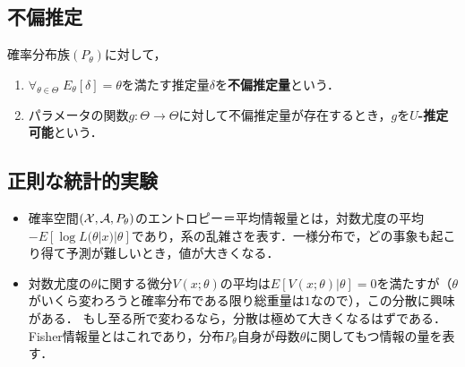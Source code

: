 \documentclass[uplatex,dvipdfmx]{jsreport}
\begin{document}
\subsection{不偏推定}

\begin{definition}
    確率分布族$(P_\theta)$に対して，
    \begin{enumerate}
        \item $\forall_{\theta\in\Theta}\;E_\theta[\delta]=\theta$を満たす推定量$\delta$を\textbf{不偏推定量}という．
        \item パラメータの関数$g:\Theta\to\Theta$に対して不偏推定量が存在するとき，$g$を\textbf{$U$-推定可能}という．
    \end{enumerate}
\end{definition}

\subsection{正則な統計的実験}

\begin{tcolorbox}[colframe=ForestGreen, colback=ForestGreen!10!white,breakable,colbacktitle=ForestGreen!40!white,coltitle=black,fonttitle=\bfseries\sffamily,
title=]
    \begin{itemize}
        \item 確率空間$(\mathcal{X},\mathcal{A},P_\theta)$のエントロピー＝平均情報量とは，対数尤度の平均$-E[\log L(\theta|x)|\theta]$であり，系の乱雑さを表す．一様分布で，どの事象も起こり得て予測が難しいとき，値が大きくなる．
        \item 対数尤度の$\theta$に関する微分$V(x;\theta)$の平均は$E[V(x;\theta)|\theta]=0$を満たすが（$\theta$がいくら変わろうと確率分布である限り総重量は$1$なので），この分散に興味がある．
        もし至る所で変わるなら，分散は極めて大きくなるはずである．
        Fisher情報量とはこれであり，分布$P_\theta$自身が母数$\theta$に関してもつ情報の量を表す．
    \end{itemize}
\end{tcolorbox}
\end{document}
